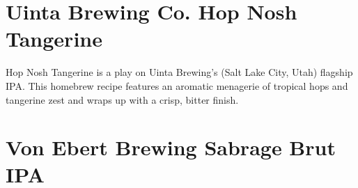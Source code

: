 \documentclass[10pt,oneside]{scrbook}
\begin{document}
\chapter*{Uinta Brewing Co. Hop Nosh Tangerine}

\begin{aboutblock}
Hop Nosh Tangerine is a play on Uinta Brewing’s (Salt Lake City, Utah) flagship IPA. This
homebrew recipe features an aromatic menagerie of tropical hops and tangerine zest and wraps
up with a crisp, bitter finish.
\end{aboutblock}


\begin{methodandtiming}
 
\begin{mashsteps}
\end{mashsteps}

\begin{fermentationsteps}
\end{fermentationsteps}

\end{methodandtiming}

\pagebreak

\begin{ingredientsblock}

\begin{malts}
\end{malts}

\begin{hops}
\end{hops}

\begin{yeasts}
\end{yeasts}

\end{ingredientsblock}

\chapter*{Von Ebert Brewing Sabrage Brut IPA}
\end{document}
